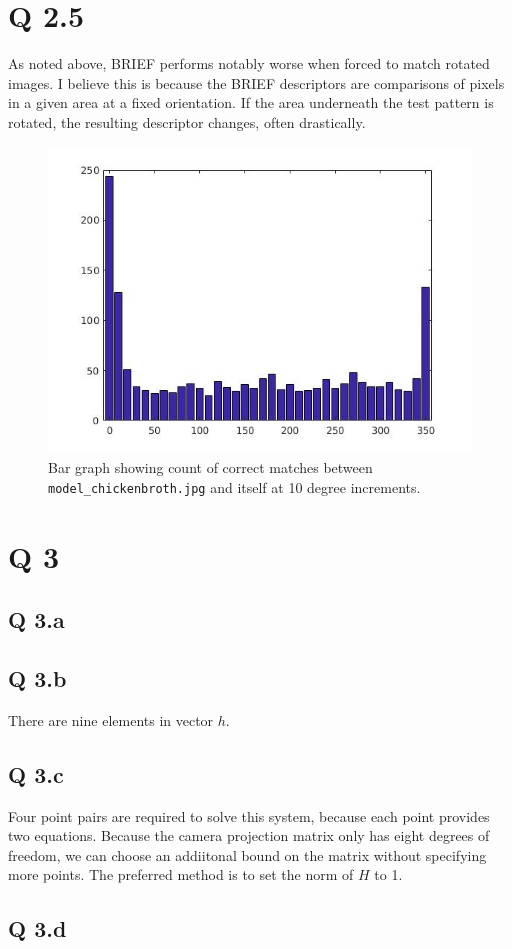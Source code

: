 \documentclass[11pt]{article}
\begin{document}
\section*{Q 2.5}
As noted above, BRIEF performs notably worse when forced to match rotated images. I believe this is 
because the BRIEF descriptors are comparisons of pixels in a given area at a fixed orientation. If 
the area underneath the test pattern is rotated, the resulting descriptor changes, often drastically. 

\begin{figure}[H]
\centering
\includegraphics[width=.7\textwidth]{results/brief_rot_test.jpg}
\caption{Bar graph showing count of correct matches between \texttt{model\_chickenbroth.jpg} 
and itself at 10 degree increments.}
\end{figure}
\section*{Q 3}
\subsection*{Q 3.a}
\subsection*{Q 3.b}
There are nine elements in vector $h$. 
\subsection*{Q 3.c}
Four point pairs are required to solve this system, because each point provides two equations.
Because the camera projection matrix only has eight degrees of freedom, we can choose an addiitonal
bound on the matrix without specifying more points. The preferred method is to set the norm
of $H$ to 1.
\subsection*{Q 3.d}
\end{document}
